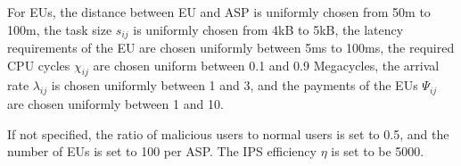 \documentclass[conference]{IEEEtran}
\begin{document}
For EUs, the distance between EU and ASP is uniformly chosen from 50m to 100m, the task size $s_{ij}$ is uniformly chosen from 4kB to 5kB, the latency requirements of the EU are chosen uniformly between 5ms to 100ms, the required CPU cycles $\chi_{ij}$ are chosen uniform between 0.1 and 0.9 Megacycles, the arrival rate $\lambda_{ij}$ is chosen uniformly between 1 and 3\cite{fan2018application}, and the payments of the EUs $\Psi_{ij}$ are chosen uniformly between 1 and 10.


If not specified, the ratio of malicious users to normal users is set to 0.5, and the number of EUs is set to 100 per ASP. The IPS efficiency $\eta$ is set to be 5000. 

\end{document}
